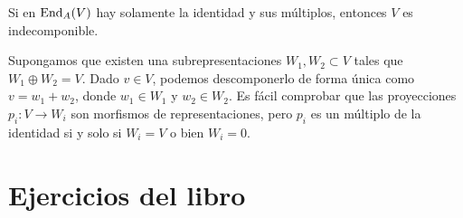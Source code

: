 \documentclass[twoside]{article}
\begin{document}
\newpage

\begin{ejercicio}{3}
Si en $\operatorname{End}_A(V)$ hay solamente la identidad y sus múltiplos, entonces $V$ es indecomponible.
\end{ejercicio}
\begin{solucion}
Supongamos que existen una subrepresentaciones $W_1,W_2\subset V$ tales que $W_1\oplus W_2= V$. Dado $v\in V$, podemos descomponerlo de forma única como $v=w_1+w_2$, donde $w_1\in W_1$ y $w_2\in W_2$. Es fácil comprobar que las proyecciones $p_i:V\to W_i$ son morfismos de representaciones, pero $p_i$ es un múltiplo de la identidad si y solo si $W_i=V$ o bien $W_i=0$. 
\end{solucion}

\newpage

\section{Ejercicios del libro}
\end{document}
